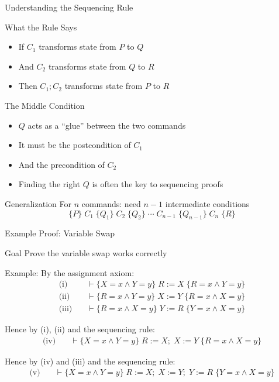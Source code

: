 \begin{frame}{Understanding the Sequencing Rule}
    \begin{block}{What the Rule Says}
        \begin{itemize}
            \item If $C_1$ transforms state from $P$ to $Q$
            \item And $C_2$ transforms state from $Q$ to $R$
            \item Then $C_1; C_2$ transforms state from $P$ to $R$
        \end{itemize}
    \end{block}
    
    \begin{block}{The Middle Condition}
        \begin{itemize}
            \item $Q$ acts as a ``glue'' between the two commands
            \item It must be the postcondition of $C_1$
            \item And the precondition of $C_2$
            \item Finding the right $Q$ is often the key to sequencing proofs
        \end{itemize}
    \end{block}
    
    \begin{block}{Generalization}
        For $n$ commands: need $n-1$ intermediate conditions
        \[ \{P\} \; C_1 \; \{Q_1\} \; C_2 \; \{Q_2\} \; \cdots \; C_{n-1} \; \{Q_{n-1}\} \; C_n \; \{R\} \]
    \end{block}
\end{frame}

\begin{frame}{Example Proof: Variable Swap}
    \begin{block}{Goal}
        Prove the variable swap works correctly
    \end{block}
    
    Example: By the assignment axiom:
    \begin{align*}
        \text{(i)} \quad & \vdash \{X=x \wedge Y=y\} \; R:=X \; \{R=x \wedge Y=y\} \\
        \text{(ii)} \quad & \vdash \{R=x \wedge Y=y\} \; X:=Y \; \{R=x \wedge X=y\} \\
        \text{(iii)} \quad & \vdash \{R=x \wedge X=y\} \; Y:=R \; \{Y=x \wedge X=y\}
    \end{align*}
    
    Hence by (i), (ii) and the sequencing rule:
    \begin{align*}
        \text{(iv)} \quad & \vdash \{X=x \wedge Y=y\} \; R:=X; \; X:=Y \; \{R=x \wedge X=y\}
    \end{align*}
    
    Hence by (iv) and (iii) and the sequencing rule:
    \begin{align*}
        \text{(v)} \quad & \vdash \{X=x \wedge Y=y\} \; R:=X; \; X:=Y; \; Y:=R \; \{Y=x \wedge X=y\}
    \end{align*}
\end{frame}

